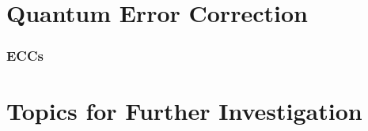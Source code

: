 \section{Quantum Error Correction}

\subsubsection{ECCs}

\section{Topics for Further Investigation}
